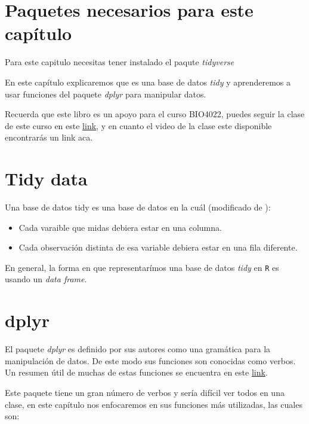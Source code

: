 \documentclass[]{book}
\providecommand{\tightlist}{%
  \setlength{\itemsep}{0pt}\setlength{\parskip}{0pt}}
\begin{document}
\hypertarget{paquetes-necesarios-para-este-capitulo}{%
\section{Paquetes necesarios para este
capítulo}\label{paquetes-necesarios-para-este-capitulo}}

Para este capitulo necesitas tener instalado el paqute \emph{tidyverse}

En este capítulo explicaremos que es una base de datos \emph{tidy}
\citep{wickham2014tidy} y aprenderemos a usar funciones del paquete
\emph{dplyr} \citep{R-dplyr} para manipular datos.

Recuerda que este libro es un apoyo para el curso BIO4022, puedes seguir
la clase de este curso en este
\href{https://derek-corcoran-barrios.github.io/Clase1/Clase1TidyData}{link},
y en cuanto el video de la clase este disponible encontrarás un link
aca.

\hypertarget{tidy-data}{%
\section{Tidy data}\label{tidy-data}}

Una base de datos tidy es una base de datos en la cuál (modificado de
\citep{leek2015elements}):

\begin{itemize}
\tightlist
\item
  Cada varaible que midas debiera estar en una columna.
\item
  Cada observación distinta de esa variable debiera estar en una fila
  diferente.
\end{itemize}

En general, la forma en que representarímos una base de datos
\emph{tidy} en \texttt{R} es usando un \emph{data frame}.

\hypertarget{dplyr}{%
\section{dplyr}\label{dplyr}}

El paquete \emph{dplyr} es definido por sus autores como una gramática
para la manipulación de datos. De este modo sus funciones son conocidas
como verbos. Un resumen útil de muchas de estas funciones se encuentra
en este
\href{https://www.rstudio.com/wp-content/uploads/2015/02/data-wrangling-cheatsheet.pdf}{link}.

Este paquete tiene un gran número de verbos y sería difícil ver todos en
una clase, en este capítulo nos enfocaremos en sus funciones más
utilizadas, las cuales son:
\end{document}
